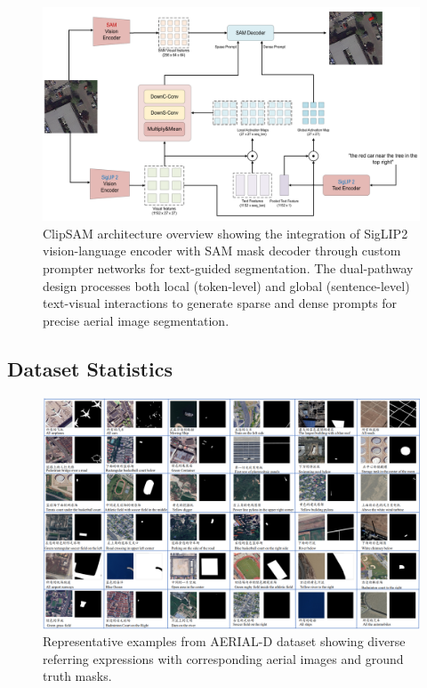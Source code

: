\begin{figure}[H]
\centering
\includegraphics[width=\textwidth]{./Images/clipsam.png}
\caption{ClipSAM architecture overview showing the integration of SigLIP2 vision-language encoder with SAM mask decoder through custom prompter networks for text-guided segmentation. The dual-pathway design processes both local (token-level) and global (sentence-level) text-visual interactions to generate sparse and dense prompts for precise aerial image segmentation.}
\label{fig:clipsam_architecture}
\end{figure}

\subsection{Dataset Statistics}

\begin{figure}[H]
\centering
\includegraphics[width=\textwidth]{./Images/dataset.png}
\caption{Representative examples from AERIAL-D dataset showing diverse referring expressions with corresponding aerial images and ground truth masks.}
\label{fig:dataset_examples}
\end{figure}


